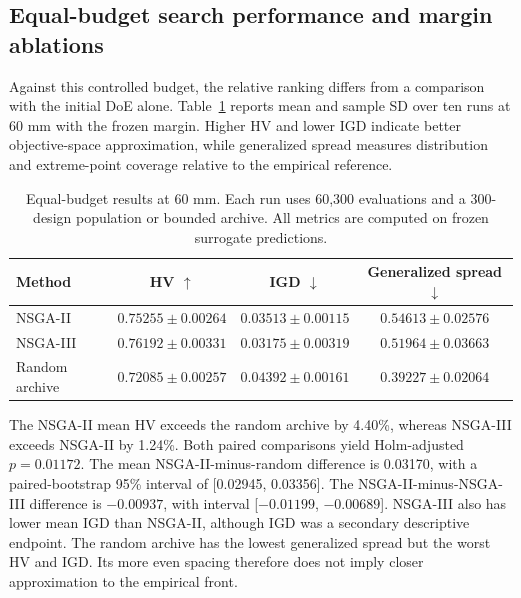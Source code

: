 \documentclass[12pt]{elsarticle}
\begin{document}
\subsection{Equal-budget search performance and margin ablations}
Against this controlled budget, the relative ranking differs from a comparison with the initial DoE alone. Table~\ref{tab:optimizer_benchmark} reports mean and sample SD over ten runs at 60 mm with the frozen margin. Higher HV and lower IGD indicate better objective-space approximation, while generalized spread measures distribution and extreme-point coverage relative to the empirical reference.
\begin{table}[H]
\centering\small
\caption{Equal-budget results at 60 mm. Each run uses 60,300 evaluations and a 300-design population or bounded archive. All metrics are computed on frozen surrogate predictions.}\label{tab:optimizer_benchmark}
\setlength{\tabcolsep}{5pt}
\begin{tabular}{lccc}
\toprule
Method & HV $\uparrow$ & IGD $\downarrow$ & Generalized spread $\downarrow$ \\
\midrule
NSGA-II & $0.75255\pm0.00264$ & $0.03513\pm0.00115$ & $0.54613\pm0.02576$ \\
NSGA-III & $0.76192\pm0.00331$ & $0.03175\pm0.00319$ & $0.51964\pm0.03663$ \\
Random archive & $0.72085\pm0.00257$ & $0.04392\pm0.00161$ & $0.39227\pm0.02064$ \\
\bottomrule
\end{tabular}
\end{table}
The NSGA-II mean HV exceeds the random archive by 4.40\%, whereas NSGA-III exceeds NSGA-II by 1.24\%. Both paired comparisons yield Holm-adjusted $p=0.01172$. The mean NSGA-II-minus-random difference is 0.03170, with a paired-bootstrap 95\% interval of [0.02945, 0.03356]. The NSGA-II-minus-NSGA-III difference is $-0.00937$, with interval [$-0.01199$, $-0.00689$]. NSGA-III also has lower mean IGD than NSGA-II, although IGD was a secondary descriptive endpoint. The random archive has the lowest generalized spread but the worst HV and IGD. Its more even spacing therefore does not imply closer approximation to the empirical front.
\end{document}
